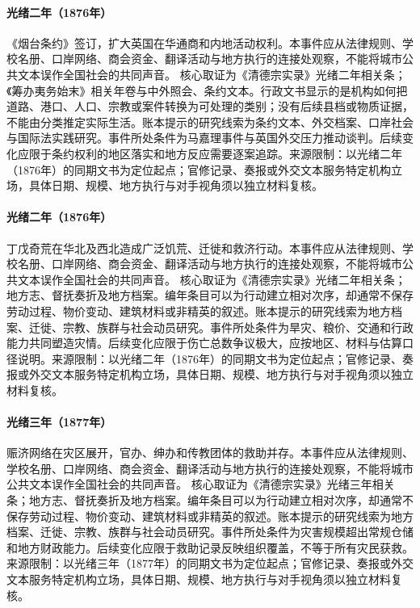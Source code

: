\hypertarget{civic:EQ-1876-CHEFOO-CONVENTION}{}\paragraph{光绪二年（1876年）}《烟台条约》签订，扩大英国在华通商和内地活动权利。本事件应从法律规则、学校名册、口岸网络、商会资金、翻译活动与地方执行的连接处观察，不能将城市公共文本误作全国社会的共同声音。 核心取证为《清德宗实录》光绪二年相关条；《筹办夷务始末》相关年卷与中外照会、条约文本。行政文书显示的是机构如何把道路、港口、人口、宗教或案件转换为可处理的类别；没有后续县档或物质证据，不能由分类推定实际生活。账本提示的研究线索为条约文本、外交档案、口岸社会与国际法实践研究。事件所处条件为马嘉理事件与英国外交压力推动谈判。后续变化应限于条约权利的地区落实和地方反应需要逐案追踪。来源限制：以光绪二年（1876年）的同期文书为定位起点；官修记录、奏报或外交文本服务特定机构立场，具体日期、规模、地方执行与对手视角须以独立材料复核。
\hypertarget{civic:EQ-1876-NORTH-CHINA-FAMINE}{}\paragraph{光绪二年（1876年）}丁戊奇荒在华北及西北造成广泛饥荒、迁徙和救济行动。本事件应从法律规则、学校名册、口岸网络、商会资金、翻译活动与地方执行的连接处观察，不能将城市公共文本误作全国社会的共同声音。 核心取证为《清德宗实录》光绪二年相关条；地方志、督抚奏折及地方档案。编年条目可以为行动建立相对次序，却通常不保存劳动过程、物价变动、建筑材料或非精英的叙述。账本提示的研究线索为地方档案、迁徙、宗教、族群与社会动员研究。事件所处条件为旱灾、粮价、交通和行政能力共同塑造灾情。后续变化应限于伤亡总数争议极大，应按地区、材料与估算口径说明。来源限制：以光绪二年（1876年）的同期文书为定位起点；官修记录、奏报或外交文本服务特定机构立场，具体日期、规模、地方执行与对手视角须以独立材料复核。
\hypertarget{civic:EQ-1877-FAMINE-RELIEF-NETWORKS}{}\paragraph{光绪三年（1877年）}赈济网络在灾区展开，官办、绅办和传教团体的救助并存。本事件应从法律规则、学校名册、口岸网络、商会资金、翻译活动与地方执行的连接处观察，不能将城市公共文本误作全国社会的共同声音。 核心取证为《清德宗实录》光绪三年相关条；地方志、督抚奏折及地方档案。编年条目可以为行动建立相对次序，却通常不保存劳动过程、物价变动、建筑材料或非精英的叙述。账本提示的研究线索为地方档案、迁徙、宗教、族群与社会动员研究。事件所处条件为灾害规模超出常规仓储和地方财政能力。后续变化应限于救助记录反映组织覆盖，不等于所有灾民获救。来源限制：以光绪三年（1877年）的同期文书为定位起点；官修记录、奏报或外交文本服务特定机构立场，具体日期、规模、地方执行与对手视角须以独立材料复核。
